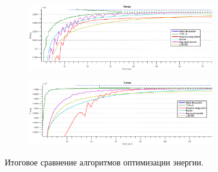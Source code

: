 \documentclass{article}
\begin{document}
\begin{figure}
    \centering
    \begin{subfigure}[t]{\textwidth}
            \centering
            \includegraphics[width=0.9\textwidth]{comparative_venus.eps}
    \end{subfigure}
    \begin{subfigure}[t]{\textwidth}
            \centering
            \includegraphics[width=0.9\textwidth]{comparative_cones.eps}
    \end{subfigure}
    \caption{Итоговое сравнение алгоритмов оптимизации энергии.}
    \label{fig:comparative_extra}
\end{figure}
\end{document}
